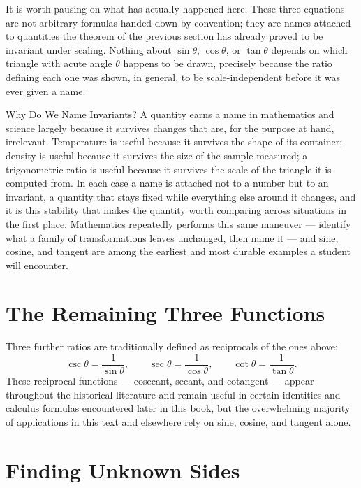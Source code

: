 It is worth pausing on what has actually happened here. These three
equations are not arbitrary formulas handed down by convention; they are
names attached to quantities the theorem of the previous section has already
proved to be invariant under scaling. Nothing about $\sin\theta$,
$\cos\theta$, or $\tan\theta$ depends on which triangle with acute angle
$\theta$ happens to be drawn, precisely because the ratio defining each one
was shown, in general, to be scale-independent before it was ever given a
name.

\begin{sidebar}{Why Do We Name Invariants?}
A quantity earns a name in mathematics and science largely because it
survives changes that are, for the purpose at hand, irrelevant. Temperature
is useful because it survives the shape of its container; density is useful
because it survives the size of the sample measured; a trigonometric ratio
is useful because it survives the scale of the triangle it is computed from.
In each case a name is attached not to a number but to an invariant, a
quantity that stays fixed while everything else around it changes, and it is
this stability that makes the quantity worth comparing across situations in
the first place. Mathematics repeatedly performs this same maneuver ---
identify what a family of transformations leaves unchanged, then name it ---
and sine, cosine, and tangent are among the earliest and most durable
examples a student will encounter.
\end{sidebar}

\section{The Remaining Three Functions}

Three further ratios are traditionally defined as reciprocals of the ones
above:
\[
\csc\theta = \frac{1}{\sin\theta}, \qquad
\sec\theta = \frac{1}{\cos\theta}, \qquad
\cot\theta = \frac{1}{\tan\theta}.
\]
These reciprocal functions --- cosecant, secant, and cotangent --- appear
throughout the historical literature and remain useful in certain identities
and calculus formulas encountered later in this book, but the overwhelming
majority of applications in this text and elsewhere rely on sine, cosine,
and tangent alone.

\section{Finding Unknown Sides}

